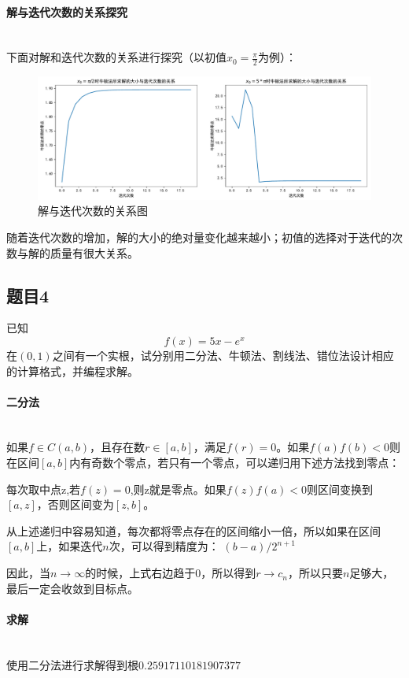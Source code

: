 \paragraph{解与迭代次数的关系探究}
~\\
下面对解和迭代次数的关系进行探究（以初值$x_0 = \frac{\pi}{2}$为例）：

\begin{figure}[H]
	\centering
	\caption{解与迭代次数的关系图}
	\includegraphics[width=\linewidth]{fig8.pdf}
\end{figure}

随着迭代次数的增加，解的大小的绝对量变化越来越小；初值的选择对于迭代的次数与解的质量有很大关系。

\subsection{题目4}

已知$$f\left(x\right) = 5x - e^x$$
在$\left(0,1\right)$之间有一个实根，试分别用二分法、牛顿法、割线法、错位法设计相应的计算格式，并编程求解。

\paragraph{二分法}
~\\
如果$f\in C(a,b)$，且存在数$r\in[a,b]$，满足$f(r)=0$。如果$f(a)f(b)<0$则在区间$[a,b]$内有奇数个零点，若只有一个零点，可以递归用下述方法找到零点：

每次取中点z,若$f(z)=0$,则z就是零点。如果$f(z)f(a)<0$则区间变换到$[a,z]$，否则区间变为$[z,b]$。

从上述递归中容易知道，每次都将零点存在的区间缩小一倍，所以如果在区间$[a,b]$上，如果迭代$n$次，可以得到精度为：
$(b-a)/2^{n+1} $

因此，当$n\rightarrow \infty $的时候，上式右边趋于0，所以得到$r→c_n$，所以只要$n$足够大， 最后一定会收敛到目标点。

\paragraph{求解}
~\\
使用二分法进行求解得到根$0.25917110181907377$

